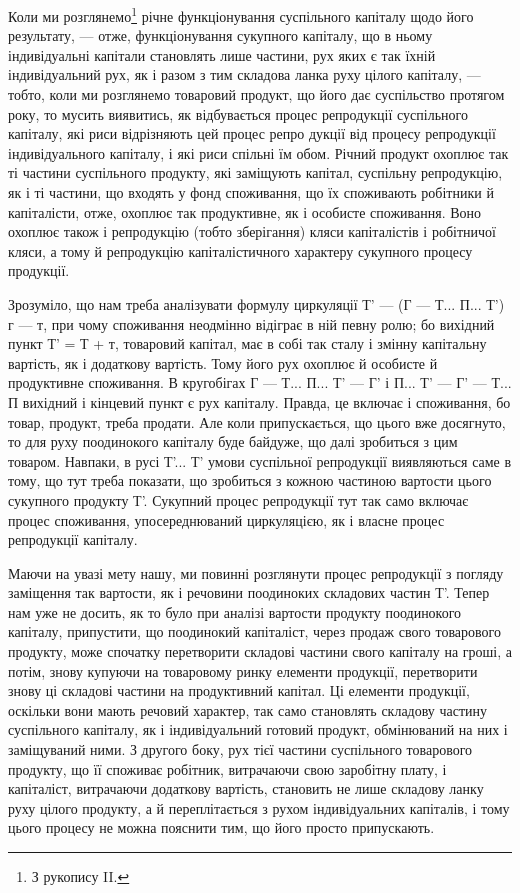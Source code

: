 Коли ми розглянемо\footnote{
З рукопису II.
} річне функціонування суспільного капіталу щодо
його результату, — отже, функціонування сукупного капіталу, що в ньому
індивідуальні капітали становлять лише частини, рух яких є так їхній
індивідуальний рух, як і разом з тим складова ланка руху цілого капіталу,
— тобто, коли ми розглянемо товаровий продукт, що його дає суспільство
протягом року, то мусить виявитись, як відбувається процес
репродукції суспільного капіталу, які риси відрізняють цей процес репро
дукції від процесу репродукції індивідуального капіталу, і які риси
спільні їм обом. Річний продукт охоплює так ті частини суспільного
продукту, які заміщують капітал, суспільну репродукцію, як і ті частини,
що входять у фонд споживання, що їх споживають робітники й капіталісти,
отже, охоплює так продуктивне, як і особисте споживання. Воно
охоплює також і репродукцію (тобто зберігання) кляси капіталістів і
робітничої кляси, а тому й репродукцію капіталістичного характеру сукупного
процесу продукції.

Зрозуміло, що нам треба аналізувати формулу циркуляції
Т' — (Г — Т... П... Т') г — т, при чому споживання неодмінно відіграє в ній
певну ролю; бо вихідний пункт Т' = Т + т, товаровий капітал, має в
собі так сталу і змінну капітальну вартість, як і додаткову вартість.
Тому його рух охоплює й особисте й продуктивне споживання. В кругобігах
Г — Т... П... Т' — Г' і П... Т' — Г' — Т... П вихідний і кінцевий
пункт є рух капіталу. Правда, це включає і споживання, бо товар,
продукт, треба продати. Але коли припускається, що цього вже досягнуто,
то для руху поодинокого капіталу буде байдуже, що далі зробиться
з цим товаром. Навпаки, в русі Т'... Т' умови суспільної репродукції
виявляються саме в тому, що тут треба показати, що зробиться з кожною
частиною вартости цього сукупного продукту Т'. Сукупний процес
репродукції тут так само включає процес споживання, упосереднюваний
циркуляцією, як і власне процес репродукції капіталу.

Маючи на увазі мету нашу, ми повинні розглянути процес репродукції
з погляду заміщення так вартости, як і речовини поодиноких складових
частин Т'. Тепер нам уже не досить, як то було при аналізі вартости
продукту поодинокого капіталу, припустити, що поодинокий
капіталіст, через продаж свого товарового продукту, може спочатку перетворити
складові частини свого капіталу на гроші, а потім, знову купуючи
на товаровому ринку елементи продукції, перетворити знову ці
складові частини на продуктивний капітал. Ці елементи продукції, оскільки
вони мають речовий характер, так само становлять складову частину
суспільного капіталу, як і індивідуальний готовий продукт, обмінюваний
на них і заміщуваний ними. З другого боку, рух тієї частини суспільного
товарового продукту, що її споживає робітник, витрачаючи свою
заробітну плату, і капіталіст, витрачаючи додаткову вартість, становить не
лише складову ланку руху цілого продукту, а й переплітається з рухом
індивідуальних капіталів, і тому цього процесу не можна пояснити тим,
що його просто припускають.

